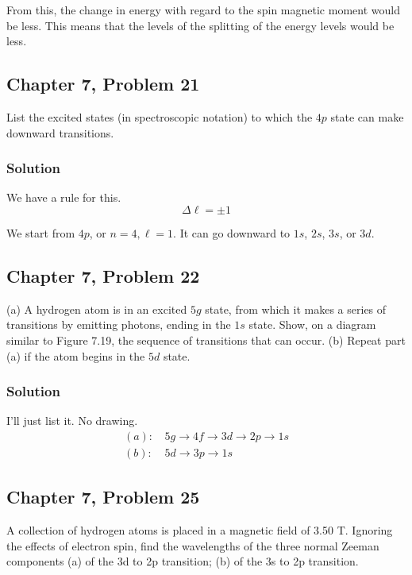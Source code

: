 \documentclass[12pt]{article}
\begin{document}
                From this, the change in energy with regard to the spin magnetic moment would be less.
                This means that the levels of the splitting of the energy levels would be less.
            \pagebreak

        \subsection{Chapter 7, Problem 21}
            List the excited states (in spectroscopic notation) to which the $4p$ state can make downward transitions.

            \subsubsection{Solution}
                We have a rule for this.
                \begin{equation}
                    \label{eq:1.8.1}
                    \Delta \ell = \pm 1
                \end{equation}

                \noindent
                We start from $4p$, or $n = 4, \ell = 1$.
                It can go downward to $1s$, $2s$, $3s$, or $3d$.
            
        \subsection{Chapter 7, Problem 22}
            (a) A hydrogen atom is in an excited $5g$ state, from which it makes a series of transitions by emitting photons, ending in the $1s$ state. 
            Show, on a diagram similar to Figure 7.19, the sequence of transitions that can occur. 
            (b) Repeat part (a) if the atom begins in the $5d$ state.

            \subsubsection{Solution}
                I'll just list it. 
                No drawing.
                \begin{align*}
                    (a):\,& 5g \to 4f \to 3d \to 2p \to 1s\\
                    (b):\,& 5d \to 3p \to 1s
                \end{align*}
            \pagebreak

        \subsection{Chapter 7, Problem 25}
            A collection of hydrogen atoms is placed in a magnetic field of 3.50 T. 
            Ignoring the effects of electron spin, find the wavelengths of the three normal Zeeman components (a) of the 3d to 2p transition; (b) of the 3s to 2p transition.
\end{document}
